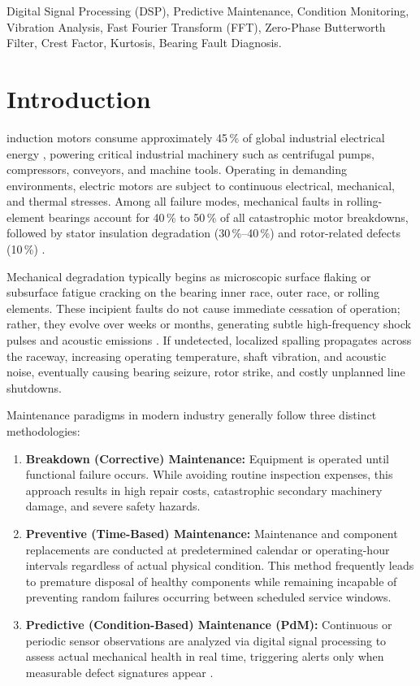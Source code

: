 \documentclass[conference,a4paper]{IEEEtran}
\begin{document}
\begin{IEEEkeywords}
Digital Signal Processing (DSP), Predictive Maintenance, Condition Monitoring, Vibration Analysis, Fast Fourier Transform (FFT), Zero-Phase Butterworth Filter, Crest Factor, Kurtosis, Bearing Fault Diagnosis.
\end{IEEEkeywords}

\section{Introduction}
 induction motors consume approximately 45\,\% of global industrial electrical energy \cite{proakis2007}, powering critical industrial machinery such as centrifugal pumps, compressors, conveyors, and machine tools. Operating in demanding environments, electric motors are subject to continuous electrical, mechanical, and thermal stresses. Among all failure modes, mechanical faults in rolling-element bearings account for 40\,\% to 50\,\% of all catastrophic motor breakdowns, followed by stator insulation degradation (30\,\%--40\,\%) and rotor-related defects (10\,\%) \cite{nandi2005}.

Mechanical degradation typically begins as microscopic surface flaking or subsurface fatigue cracking on the bearing inner race, outer race, or rolling elements. These incipient faults do not cause immediate cessation of operation; rather, they evolve over weeks or months, generating subtle high-frequency shock pulses and acoustic emissions \cite{randall2011}. If undetected, localized spalling propagates across the raceway, increasing operating temperature, shaft vibration, and acoustic noise, eventually causing bearing seizure, rotor strike, and costly unplanned line shutdowns.

Maintenance paradigms in modern industry generally follow three distinct methodologies:
\begin{enumerate}
    \item \textbf{Breakdown (Corrective) Maintenance:} Equipment is operated until functional failure occurs. While avoiding routine inspection expenses, this approach results in high repair costs, catastrophic secondary machinery damage, and severe safety hazards.
    \item \textbf{Preventive (Time-Based) Maintenance:} Maintenance and component replacements are conducted at predetermined calendar or operating-hour intervals regardless of actual physical condition. This method frequently leads to premature disposal of healthy components while remaining incapable of preventing random failures occurring between scheduled service windows.
    \item \textbf{Predictive (Condition-Based) Maintenance (PdM):} Continuous or periodic sensor observations are analyzed via digital signal processing to assess actual mechanical health in real time, triggering alerts only when measurable defect signatures appear \cite{lei2020}.
\end{enumerate}
\end{document}
